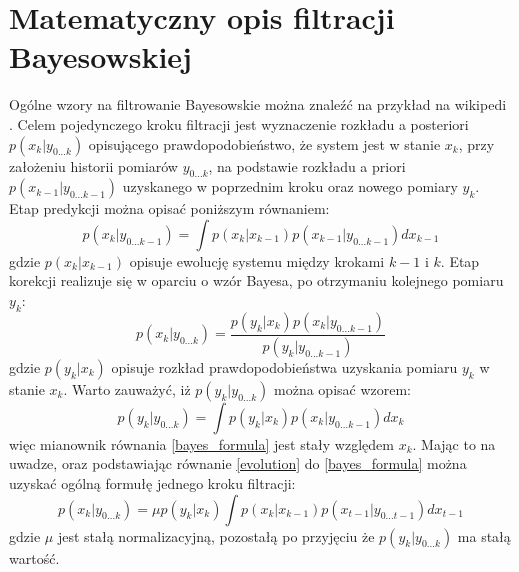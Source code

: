 \section{Matematyczny opis filtracji Bayesowskiej}
Ogólne wzory na filtrowanie Bayesowskie można znaleźć na przykład na wikipedi \cite{wiki_bayes_filter}. Celem pojedynczego kroku filtracji jest wyznaczenie rozkładu a posteriori $p(x_{k}|y_{0...k})$ opisującego prawdopodobieństwo, że system jest w stanie $x_k$, przy założeniu historii pomiarów $y_{0...k}$, na podstawie rozkładu a priori $p(x_{k-1}|y_{0...k-1})$ uzyskanego w poprzednim kroku oraz nowego pomiary $y_k$. Etap predykcji można opisać poniższym równaniem:
\begin{equation} \label{evolution}
	p(x_k|y_{0...k-1})=\int p(x_k|x_{k-1})p(x_{k-1}|y_{0...k-1}) dx_{k-1}
\end{equation}
gdzie $p(x_k|x_{k-1})$ opisuje ewolucję systemu między krokami $k-1$ i $k$. Etap korekcji realizuje się w oparciu o wzór Bayesa, po otrzymaniu kolejnego pomiaru $y_k$:
\begin{equation}\label{bayes_formula}
	p(x_k|y_{0...k})=\frac{p(y_k|x_k)p(x_k|y_{0...k-1})}{p(y_k|y_{0...k-1})}
\end{equation}
gdzie $p(y_k|x_k)$ opisuje rozkład prawdopodobieństwa uzyskania pomiaru $y_k$ w stanie $x_k$. Warto zauważyć, iż $p(y_k|y_{0...k})$ można opisać wzorem:
\begin{equation}
p(y_k|y_{0...k})=\int p(y_k|x_k)p(x_k|y_{0...k-1}) dx_k
\end{equation}
więc mianownik równania \ref{bayes_formula} jest stały względem $x_k$. Mając to na uwadze, oraz podstawiając równanie \ref{evolution} do \ref{bayes_formula} można uzyskać ogólną formułę jednego kroku filtracji:
\begin{equation}
	p(x_k|y_{0...k})=\mu p(y_k|x_k)\int p(x_k|x_{k-1})p(x_{t-1}|y_{0...t-1}) dx_{t-1}
\end{equation}
gdzie $\mu$ jest stałą normalizacyjną, pozostałą po przyjęciu że $p(y_k|y_{0...k})$ ma stałą wartość.
